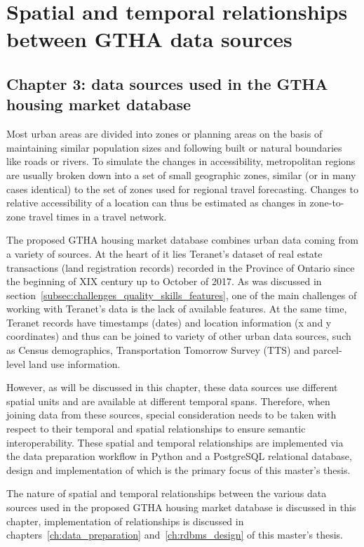 \chapter{Spatial and temporal relationships between GTHA data sources} \label{ch:spatial_and_temporal_relationships_between_urban_data}

\section{Chapter 3: data sources used in the GTHA housing market database} \label{sec:chapter_3_intro}

Most urban areas are divided into zones or planning areas on the basis of maintaining similar population sizes and following built or natural boundaries like roads or rivers.
To simulate the changes in accessibility, metropolitan regions are usually broken down into a set of small geographic zones, similar (or in many cases identical) to the set of zones used for regional travel forecasting.
Changes to relative accessibility of a location can thus be estimated as changes in zone-to-zone travel times in a travel network\cite{Iacono2008}.

The proposed GTHA housing market database combines urban data coming from a variety of sources.
At the heart of it lies Teranet's dataset of real estate transactions (land registration records) recorded in the Province of Ontario since the beginning of XIX century up to October of 2017.
As was discussed in section~\ref{subsec:challenges_quality_skills_features}, one of the main challenges of working with Teranet's data is the lack of available features.
At the same time, Teranet records have timestamps (dates) and location information (x and y coordinates) and thus can be joined to variety of other urban data sources, such as Census demographics, Transportation Tomorrow Survey (TTS) and parcel-level land use information.

However, as will be discussed in this chapter, these data sources use different spatial units and are available at different temporal spans.
Therefore, when joining data from these sources, special consideration needs to be taken with respect to their temporal and spatial relationships to ensure semantic interoperability.
These spatial and temporal relationships are implemented via the data preparation workflow in Python and a PostgreSQL relational database, design and implementation of which is the primary focus of this master's thesis.

The nature of spatial and temporal relationships between the various data sources used in the proposed GTHA housing market database is discussed in this chapter, implementation of relationships is discussed in chapters~\ref{ch:data_preparation} and~\ref{ch:rdbms_design} of this master's thesis.

